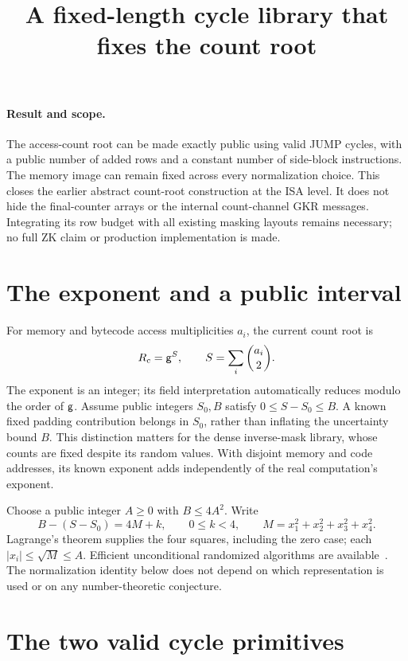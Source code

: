\documentclass[11pt]{article}
\title{A fixed-length cycle library that fixes the count root}
\author{}
\date{}
\begin{document}
\maketitle
\vspace{-2em}

\paragraph{Result and scope.} The access-count root can be made exactly public using valid JUMP cycles, with a public number of added rows and a constant number of side-block instructions. The memory image can remain fixed across every normalization choice. This closes the earlier abstract count-root construction at the ISA level. It does not hide the final-counter arrays or the internal count-channel GKR messages. Integrating its row budget with all existing masking layouts remains necessary; no full ZK claim or production implementation is made.

\section{The exponent and a public interval}

For memory and bytecode access multiplicities $a_i$, the current count root is
\[
 R_c=\mathsf{g}^S,\qquad S=\sum_i\binom{a_i}{2}.
\]
The exponent is an integer; its field interpretation automatically reduces modulo the order of $\mathsf{g}$. Assume public integers $S_0,B$ satisfy $0\le S-S_0\le B$. A known fixed padding contribution belongs in $S_0$, rather than inflating the uncertainty bound $B$. This distinction matters for the dense inverse-mask library, whose counts are fixed despite its random values. With disjoint memory and code addresses, its known exponent adds independently of the real computation's exponent.

Choose a public integer $A\ge0$ with $B\le4A^2$. Write
\[
 B-(S-S_0)=4M+k,\qquad 0\le k<4,
 \qquad M=x_1^2+x_2^2+x_3^2+x_4^2.
\]
Lagrange's theorem supplies the four squares, including the zero case; each $|x_i|\le\sqrt M\le A$. Efficient unconditional randomized algorithms are available~\cite{pt}. The normalization identity below does not depend on which representation is used or on any number-theoretic conjecture.

\section{The two valid cycle primitives}
\end{document}
